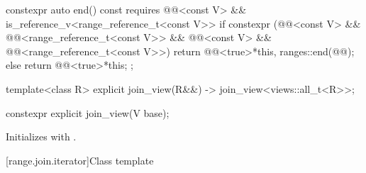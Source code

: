 \begin{codeblock}
{{    constexpr auto end() const
      requires @@<const V> &&
               is_reference_v<range_reference_t<const V>> {
      if constexpr (@@<const V> &&
                    @@<range_reference_t<const V>> &&
                    @@<const V> &&
                    @@<range_reference_t<const V>>)
        return @@<true>{*this, ranges::end(@@)};
      else
        return @@<true>{*this};
    }
  };

  template<class R>
    explicit join_view(R&&) -> join_view<views::all_t<R>>;
}
\end{codeblock}

%
\begin{itemdecl}
constexpr explicit join_view(V base);
\end{itemdecl}

\begin{itemdescr}
\pnum
\effects
Initializes  with .
\end{itemdescr}

[range.join.iterator]{Class template }

